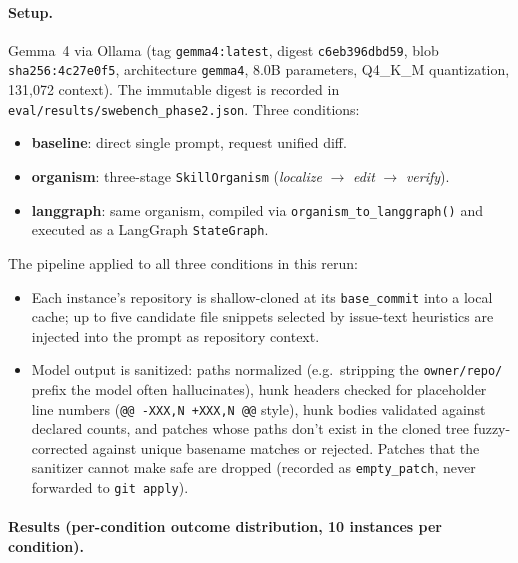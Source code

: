 \paragraph{Setup.} Gemma~4 via Ollama (tag \texttt{gemma4:latest}, digest \texttt{c6eb396dbd59}, blob \texttt{sha256:4c27e0f5}, architecture \texttt{gemma4}, 8.0B parameters, Q4\_K\_M quantization, 131{,}072 context). The immutable digest is recorded in \texttt{eval/results/swebench\_phase2.json}. Three conditions:
\begin{itemize}[leftmargin=*]
\item \textbf{baseline}: direct single prompt, request unified diff.
\item \textbf{organism}: three-stage \texttt{SkillOrganism} (\textit{localize} $\to$ \textit{edit} $\to$ \textit{verify}).
\item \textbf{langgraph}: same organism, compiled via \texttt{organism\_to\_langgraph()} and executed as a LangGraph \texttt{StateGraph}.
\end{itemize}

The pipeline applied to all three conditions in this rerun:
\begin{itemize}[leftmargin=*]
\item Each instance's repository is shallow-cloned at its \texttt{base\_commit} into a local cache; up to five candidate file snippets selected by issue-text heuristics are injected into the prompt as repository context.
\item Model output is sanitized: paths normalized (e.g.\ stripping the \texttt{owner/repo/} prefix the model often hallucinates), hunk headers checked for placeholder line numbers (\texttt{@@ -XXX,N +XXX,N @@} style), hunk bodies validated against declared counts, and patches whose paths don't exist in the cloned tree fuzzy-corrected against unique basename matches or rejected. Patches that the sanitizer cannot make safe are dropped (recorded as \texttt{empty\_patch}, never forwarded to \texttt{git apply}).
\end{itemize}

\paragraph{Results (per-condition outcome distribution, 10 instances per condition).}

